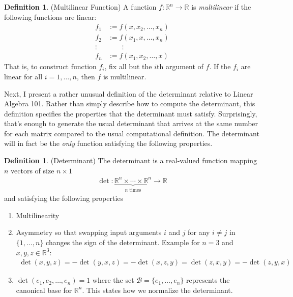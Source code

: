 \documentclass[12pt]{article}
\numberwithin{equation}{section} %
\theoremstyle{plain}
\theoremstyle{definition}
\newtheorem{defn}[thm]{Definition}
\theoremstyle{remark}
\newcommand{\R}{\mathbb{R}}
\begin{document}
\begin{defn}{(Multilinear Function)}
A function $f:\R^n\rightarrow \R$ is \emph{multilinear} if the following
functions are linear:
\begin{align*}
  f_1 &:= f(x,x_2,\ldots,x_n)\\
  f_2 &:= f(x_1,x,\ldots,x_n)\\
  \vdots\; & \qquad \vdots\\
  f_n &:= f(x_1,x_2,\ldots,x)
\end{align*}
That is, to construct function $f_i$, fix all but the $i$th argument of
$f$. If the $f_i$ are linear for all $i = 1,\ldots, n$, then $f$ is
multilinear.
\end{defn}

Next, I present a rather unusual definition of the determinant relative
to Linear Algebra 101. Rather than simply describe how to compute the
determinant, this definition specifies the properties that the
determinant must satisfy. Surprisingly, that's enough to generate the
usual determinant that arrives at the same number for each matrix
compared to the usual computational definition. The determinant will in
fact be the \emph{only} function satisfying the following properties.

\begin{defn}{(Determinant)}
The determinant is a real-valued function mapping $n$ vectors of size
$n\times 1$
\begin{align*}
  \det: \underbrace{\R^n \times \cdots \times \R^n}_{n \;\text{times}}
  \rightarrow \R
\end{align*}
and satisfying the following properties
\begin{enumerate}
  \item Multilinearity
  \item Asymmetry so that swapping input arguments $i$ and $j$ for any
    $i\neq j$ in $\{1,\ldots,n\}$ changes the sign of the determinant.
    Example for $n=3$ and $x,y,z\in \R^3$:
    \begin{align*}
      \det(x,y,z) = -\det(y,x,z) = - \det(x,z,y)
      = \det(z,x,y) = -\det(z,y,x)
    \end{align*}
  \item $\det(e_1,e_2,\ldots,e_n)=1$ where the set
    $\mathcal{B}=\{e_1,\ldots,e_n\}$ represents the canonical base for
    $\R^n$. This states how we normalize the determinant.
\end{enumerate}
\end{defn}
\end{document}
